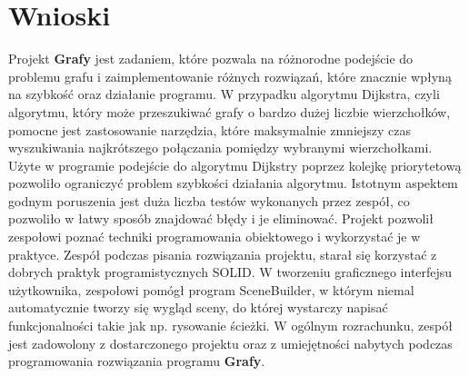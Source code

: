 \documentclass[10pt]{article}
\begin{document}
\section{Wnioski}
Projekt \textbf{Grafy} jest zadaniem, które pozwala na różnorodne podejście do problemu grafu i zaimplementowanie różnych rozwiązań, które znacznie wpłyną na szybkość oraz działanie programu. W przypadku algorytmu Dijkstra, czyli algorytmu, który może przeszukiwać grafy o bardzo dużej liczbie wierzchołków, pomocne jest zastosowanie narzędzia, które maksymalnie zmniejszy czas wyszukiwania najkrótszego połączania pomiędzy wybranymi wierzchołkami. Użyte w programie podejście do algorytmu Dijkstry poprzez kolejkę priorytetową pozwoliło ograniczyć problem szybkości działania algorytmu. Istotnym aspektem godnym poruszenia jest duża liczba testów wykonanych przez zespół, co pozwoliło w łatwy sposób znajdować błędy i je eliminować. Projekt pozwolił zespołowi poznać techniki programowania obiektowego i wykorzystać je w praktyce. Zespół podczas pisania rozwiązania projektu, starał się korzystać z dobrych praktyk programistycznych SOLID. W tworzeniu graficznego interfejsu użytkownika, zespołowi pomógł program SceneBuilder, w którym niemal automatycznie tworzy się wygląd sceny, do której wystarczy napisać funkcjonalności takie jak np. rysowanie ścieżki. W ogólnym rozrachunku, zespół jest zadowolony z dostarczonego projektu oraz z umiejętności nabytych podczas programowania rozwiązania programu \textbf{Grafy}. 
\end{document}
